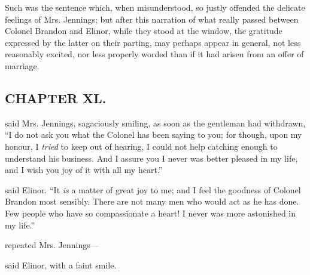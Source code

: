 Such was the sentence which, when misunderstood, so justly offended the delicate feelings of Mrs. Jennings; but after this narration of what really passed between Colonel Brandon and Elinor, while they stood at the window, the gratitude expressed by the latter on their parting, may perhaps appear in general, not less reasonably excited, nor less properly worded than if it had arisen from an offer of marriage.

\subsection[chapter-xl.]{\useURL[url40][][][]\from[url40]CHAPTER XL.}

 said Mrs. Jennings, sagaciously smiling, as soon as the gentleman had withdrawn, “I do not ask you what the Colonel has been saying to you; for though, upon my honour, I {\em tried} to keep out of hearing, I could not help catching enough to understand his business. And I assure you I never was better pleased in my life, and I wish you joy of it with all my heart.”

 said Elinor. “It {\em is} a matter of great joy to me; and I feel the goodness of Colonel Brandon most sensibly. There are not many men who would act as he has done. Few people who have so compassionate a heart! I never was more astonished in my life.”



 repeated Mrs. Jennings---

 said Elinor, with a faint smile.


